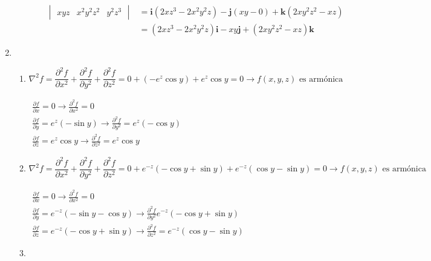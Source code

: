\begin{enumerate}[label=\color{red}\textbf{\arabic*)}]
\begin{enumerate}[label=\color{red}\textbf{\alph*)}]
\begin{enumerate}[label=\arabic*)]
\[\begin{aligned}
\begin{vmatrix}
                    xyz & x^2y^2z^2 & y^2z^3
                  \end{vmatrix} &= \mathbf{i} (2xz^3-2x^2y^2z)-\mathbf{j} (xy-0)+\mathbf{k} (2xy^2z^2-xz)\\
                  &=(2xz^3-2x^2y^2z)\mathbf{i} -xy\mathbf{j} +(2xy^2z^2-xz)\mathbf{k} 
                  \end{aligned}
                  \] 
              \end{enumerate}
    \end{enumerate}
  \item {}
\begin{enumerate}[label=\color{red}\textbf{\alph*)}]
  \item {}

    \[
    \nabla ^2f=\frac{\partial^2 f}{\partial x^2} +\frac{\partial^2 f}{\partial y^2} +\frac{\partial^2 f}{\partial z^2} = 0 + (-e^{z}\cos y )+e^{z}\cos y=0\longrightarrow f(x,y,z)\text{ es armónica} 
    \] 
    
    $\begin{array}{l}
      \frac{\partial f}{\partial x} = 0\longrightarrow \frac{\partial^2 f}{\partial x^2} =0\\
      \frac{\partial f}{\partial y} =e^{z}(-\sin y)\longrightarrow \frac{\partial^2 f}{\partial y^2} =e^{z}(-\cos y)  \\
      \frac{\partial f}{\partial z} =e^{z}\cos y\longrightarrow \frac{\partial^2 f}{\partial z^2} =e^{z} \cos y 
    \end{array}$
  \item {}
    
    \[
    \nabla ^2f=\frac{\partial^2 f}{\partial x^2} +\frac{\partial^2 f}{\partial y^2} +\frac{\partial^2 f}{\partial z^2} = 0 + e^{-z}(-\cos y+\sin y)+e^{-z}(\cos y -\sin y)=0\longrightarrow f(x,y,z)\text{ es armónica }  
    \] 

    $\begin{array}{l}
      \frac{\partial f}{\partial x} =0\longrightarrow \frac{\partial^2 f}{\partial x^2} =0\\
      \frac{\partial f}{\partial y} =e^{-z}(-\sin y-\cos y)\longrightarrow \frac{\partial^2 f}{\partial y^2} e^{-z}(-\cos y + \sin y)\\
      \frac{\partial f}{\partial z} =e^{-z}(-\cos y + \sin y)\longrightarrow \frac{\partial^2 f}{\partial z^2} =e^{-z}(\cos y -\sin y)  
    \end{array}$
  \item {} 


\end{enumerate}
\end{enumerate}
